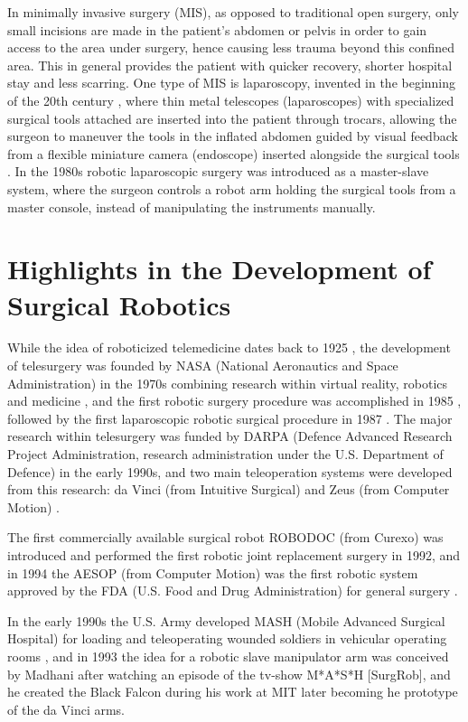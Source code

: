 In minimally invasive surgery (MIS), as opposed to traditional open surgery, only small incisions are made in the patient's abdomen or pelvis in order to gain access to the area under surgery, hence causing less trauma beyond this confined area. This in general provides the patient with quicker recovery, shorter hospital stay and less scarring.
One type of MIS is laparoscopy, invented in the beginning of the 20th century \citep{bib:laparoscopy}, where thin metal telescopes (laparoscopes) with specialized surgical tools attached are inserted into the patient through trocars, allowing the surgeon to maneuver the tools in the inflated abdomen guided by visual feedback from a flexible miniature camera (endoscope) inserted alongside the surgical tools \citep{bib:fascrs}.
In the 1980s robotic laparoscopic surgery was introduced as a master-slave system, where the surgeon controls a robot arm holding the surgical tools from a master console, instead of manipulating the instruments manually.

\section{Highlights in the Development of Surgical Robotics}
While the idea of roboticized telemedicine dates back to 1925 \citep{bib:telemed_predict}, the development of telesurgery was founded by NASA (National Aeronautics and Space Administration) in the 1970s \citep{bib:telesurg_history} combining research within virtual reality, robotics and medicine \citep{bib:brown_univ}, and the first robotic surgery procedure was accomplished in 1985 \citep{bib:telesurg_history}, followed by the first laparoscopic robotic surgical procedure in 1987 \citep{bib:brown_univ}.
The major research within telesurgery was funded by DARPA (Defence Advanced Research Project Administration, research administration under the U.S. Department of Defence) in the early 1990s, and two main teleoperation systems were developed from this research: da Vinci (from Intuitive Surgical) and Zeus (from Computer Motion) \citep{bib:telesurg_history}.

The first commercially available surgical robot ROBODOC (from Curexo) was introduced and performed the first robotic joint replacement surgery in 1992, and in 1994 the AESOP (from Computer Motion) was the first robotic system approved by the FDA (U.S. Food and Drug Administration) for general surgery \citep[p 74]{bib:telesurg_history,bib:surgical_book}.

In the early 1990s the U.S. Army developed MASH (Mobile Advanced Surgical Hospital) for loading and teleoperating wounded soldiers in vehicular operating rooms \citep{bib:brown_univ}, and in 1993 the idea for a robotic slave manipulator arm was conceived by Madhani after watching an episode of the tv-show M*A*S*H [SurgRob], and he created the Black Falcon during his work at MIT \citep{bib:black_falcon} later becoming he prototype of the da Vinci arms.

